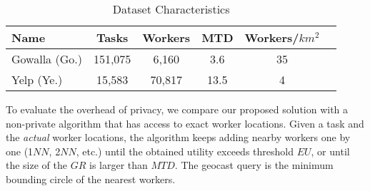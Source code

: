 \documentclass{USC-Thesis}
\newcommand{\tn}{\tabularnewline}
\numberwithin{equation}{chapter}
\begin{document}
\begin{table}
\begin{center}
\footnotesize
\begin{tabular}{ l | c |  c | c | c | r}
\hline
\textbf{Name} & \textbf{Tasks} & \textbf{Workers} & \textbf{MTD} & \textbf{Workers/$km^2$} \tn
\hline
Gowalla (Go.) & 151,075 & 6,160 & 3.6 & 35   \tn
\hline
Yelp (Ye.) & 15,583 & 70,817 & 13.5 & 4  \tn
\hline
\end{tabular}
\caption{Dataset Characteristics}
\label{tab:real_datasets}
\end{center}
\end{table}

\begin{comment}
\begin{figure*}[ht]
	\begin{minipage}[b]{0.33\linewidth}
	\centering
		\texttt{[image: exps/gowalla\_sf\_workers]}
		\subcaption{Gowalla, San Francisco}
		\label{fig:gowalla_sf}	
	\end{minipage}
	\begin{minipage}[b]{0.33\linewidth}
	\centering
		\texttt{[image: exps/yelp\_workers]}
		\subcaption{Yelp, Greater Phoenix}
		\label{fig:yelp}	
	\end{minipage}
	\begin{minipage}[b]{0.33\linewidth}
	\centering
		\texttt{[image: exps/foursquare\_workers]}
		\subcaption{Foursquare, Pittsburgh}
		\label{fig:foursquare}	
	\end{minipage}
\caption{Worker distributions in real-world datasets (one time snapshot)}
\label{fig:data_distribution}
\end{figure*}
\end{comment}


To evaluate the overhead of privacy, we compare our proposed solution with a non-private algorithm that has access to exact worker locations. Given a task and the {\em actual} worker locations, the algorithm keeps adding nearby workers one by one (1$\mathit{NN}$, 2$\mathit{NN}$, etc.) until the obtained utility exceeds threshold $\mathit{EU}$, or until the size of the $GR$ is larger than $\mathit{MTD}$. The geocast query is the minimum bounding circle of the nearest workers.
\end{document}
